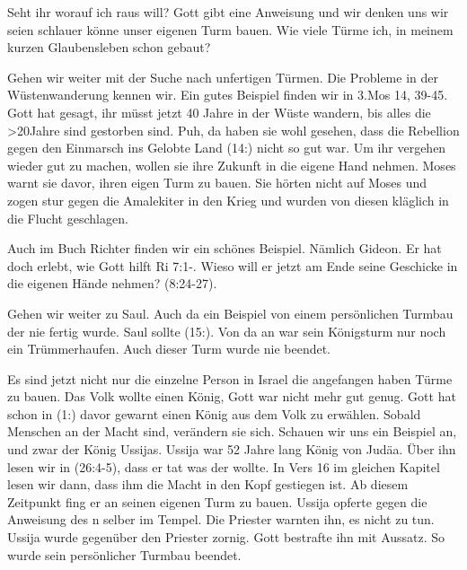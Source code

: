 \documentclass[14pt]{../../inc/mybib}
\begin{document}
    Seht ihr worauf ich raus will? Gott gibt eine Anweisung und wir denken uns wir seien schlauer könne unser eigenen Turm bauen. Wie viele Türme ich, in meinem kurzen Glaubensleben schon gebaut?

    Gehen wir weiter mit der Suche nach unfertigen Türmen. Die Probleme in der Wüstenwanderung kennen wir. Ein gutes Beispiel finden wir in 3.Mos 14, 39-45. Gott hat gesagt, ihr müsst jetzt 40 Jahre in der Wüste wandern, bis alles die >20Jahre sind gestorben sind. Puh, da haben sie wohl gesehen, dass die Rebellion gegen den Einmarsch ins Gelobte Land (14:) nicht so gut war. Um ihr vergehen wieder gut zu machen, wollen sie ihre Zukunft in die eigene Hand nehmen. Moses warnt sie davor, ihren eigen Turm zu bauen. Sie hörten nicht auf Moses und zogen stur gegen die Amalekiter in den Krieg und wurden von diesen kläglich in die Flucht geschlagen.

    Auch im Buch Richter finden wir ein schönes Beispiel. Nämlich Gideon. Er hat doch erlebt, wie Gott hilft Ri 7:1-. Wieso will er jetzt am Ende seine Geschicke in die eigenen Hände nehmen? (8:24-27). 

    Gehen wir weiter zu Saul. Auch da ein Beispiel von einem persönlichen Turmbau der nie fertig wurde. Saul sollte (15:). Von da an war sein Königsturm nur noch ein Trümmerhaufen. Auch dieser Turm wurde nie beendet.

    Es sind jetzt nicht nur die einzelne Person in Israel die angefangen haben Türme zu bauen. Das Volk wollte einen König, Gott war nicht mehr gut genug. Gott hat schon in (1:) davor gewarnt einen König aus dem Volk zu erwählen. Sobald Menschen an der Macht sind, verändern sie sich. Schauen wir uns ein Beispiel an, und zwar der König Ussijas. Ussija war 52 Jahre lang König von Judäa. Über ihn lesen wir in (26:4-5), dass er tat was der \herr{} wollte. In Vers 16 im gleichen Kapitel lesen wir dann, dass ihm die Macht in den Kopf gestiegen ist. Ab diesem Zeitpunkt fing er an seinen eigenen Turm zu bauen. Ussija opferte gegen die Anweisung des \herr n selber im Tempel. Die Priester warnten ihn, es nicht zu tun. Ussija wurde gegenüber den Priester zornig. Gott bestrafte ihn mit Aussatz. So wurde sein persönlicher Turmbau beendet.
\end{document}

